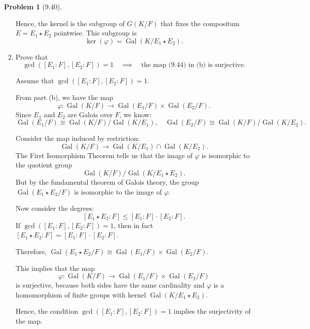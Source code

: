 \documentclass[12pt]{article}
\theoremstyle{definition}
\newtheorem{problem}{Problem}
\begin{document}
\begin{problem}[9.40]
\begin{enumerate}[label=(\alph*)]
\begin{solution}
            Hence, the kernel is the subgroup of $G(K/F)$ that fixes the compositum $E = E_1 \star E_2$ pointwise. This subgroup is
            \[
                \ker(\varphi) = \operatorname{Gal}(K/E_1 \star E_2).
            \]
        \end{solution}

        \item Prove that
              \[
                    \gcd([E_1 : F], [E_2 : F]) = 1 \quad \implies \quad \text{the map (9.44) in (b) is surjective.}
              \]
        
        \begin{solution}
            Assume that $\gcd([E_1 : F], [E_2 : F]) = 1$.

            From part (b), we have the map
            \[
                \varphi: \operatorname{Gal}(K/F) \longrightarrow \operatorname{Gal}(E_1/F) \times \operatorname{Gal}(E_2/F).
            \]
            Since $E_1$ and $E_2$ are Galois over $F$, we know:
            \[
                \operatorname{Gal}(E_1/F) \cong \operatorname{Gal}(K/F)/\operatorname{Gal}(K/E_1), \quad \operatorname{Gal}(E_2/F) \cong \operatorname{Gal}(K/F)/\operatorname{Gal}(K/E_2).
            \]

            Consider the map induced by restriction:
            \[
                \operatorname{Gal}(K/F) \longrightarrow \operatorname{Gal}(K/E_1) \cap \operatorname{Gal}(K/E_2).
            \]
            The First Isomorphism Theorem tells us that the image of $\varphi$ is isomorphic to the quotient group
            \[
                \operatorname{Gal}(K/F)/\operatorname{Gal}(K/E_1 \star E_2).
            \]
            But by the fundamental theorem of Galois theory, the group $\operatorname{Gal}(E_1 \star E_2/F)$ is isomorphic to the image of $\varphi$.

            Now consider the degrees:
            \[
                [E_1 \star E_2 : F] \leq [E_1 : F] \cdot [E_2 : F].
            \]
            If $\gcd([E_1 : F], [E_2 : F]) = 1$, then in fact $[E_1 \star E_2 : F] = [E_1 : F] \cdot [E_2 : F]$.

            Therefore, $\operatorname{Gal}(E_1 \star E_2/F) \cong \operatorname{Gal}(E_1/F) \times \operatorname{Gal}(E_2/F)$.

            This implies that the map
            \[
                \varphi: \operatorname{Gal}(K/F) \to \operatorname{Gal}(E_1/F) \times \operatorname{Gal}(E_2/F)
            \]
            is surjective, because both sides have the same cardinality and $\varphi$ is a homomorphism of finite groups with kernel $\operatorname{Gal}(K/E_1 \star E_2)$.

            Hence, the condition $\gcd([E_1 : F], [E_2 : F]) = 1$ implies the surjectivity of the map.
        \end{solution}
    \end{enumerate}
\end{problem}
\end{document}
